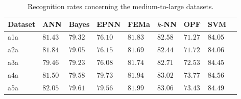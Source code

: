

\begin{table*}[!htb]
\begin{center}
\scriptsize
\caption{Recognition rates concerning the medium-to-large datasets.}
\label{tab.L_ACC}
\begin{tabular}{l|llllllll}
Dataset & ANN   & Bayes & EPNN  & FEMa  & $k$-NN   & OPF   & SVM   &  \\ \hline \hline
a1a     & $81.43$ & $79.32$ & $76.10$ & $81.83$ & $82.58$ & $71.27$ & $\mathbf{84.05}$ &  \\
a2a     & $81.84$ & $79.05$ & $76.15$ & $81.69$ & $82.44$ & $71.72$ & $\mathbf{84.06}$ &  \\
a3a     & $79.46$ & $79.23$ & $76.08$ & $81.74$ & $82.71$ & $72.53$ & $\mathbf{84.45}$ &  \\
a4a     & $81.50$ & $79.58$ & $79.73$ & $81.94$ & $83.02$ & $73.77$ & $\mathbf{84.56}$ &  \\
a5a     & $82.05$ & $79.61$ & $79.56$ & $81.99$ & $83.06$ & $73.43$ & $\mathbf{84.49}$ &  \\ \hline
\end{tabular}
\end{center}
\end{table*}




